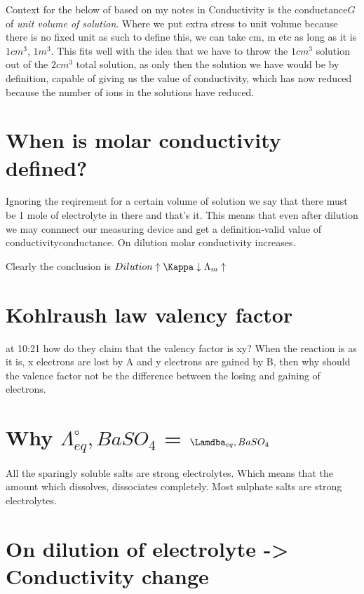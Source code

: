 \documentclass[12pt]{article}
\begin{document}
{Context for the below of based on my notes in 
Conductivity is the conductance{$G$} of \textit{unit volume of solution}. Where we put extra stress to unit volume because there is no fixed unit as such to define this, we can take cm, m etc as long as it is $1cm^{3}$, $1m^{3}$. This fits well with the idea that we have to throw the $1cm^{3}$ solution out of the $2cm^{3}$ total solution, as only then the solution we have would be by definition, capable of giving us the value of conductivity, which has now reduced because the number of ions in the solutions have reduced.

\section*{When is molar conductivity defined?}

Ignoring the reqirement for a certain volume of solution we say that there must be 1 mole of electrolyte in there and that's it. This means that even after dilution we may connnect our measuring device and get a definition-valid value of conductivity{conductance}. 
On dilution molar conductivity increases.

Clearly the conclusion is $Dilution\uparrow \Kappa \downarrow {\Lambda}_{m} \uparrow$

\section*{Kohlraush law valency factor}


at 10:21  how do they claim that the valency factor is xy? When the reaction is as it is, x electrons are lost by A and y electrons are gained by B, then why should the valence factor not be the difference between the losing and gaining of electrons.

\section*{Why $\Lambda _{eq}^{\circ}, {BaSO_{4}}$ = $\Lamdba _{eq}, {BaSO_{4}}$}

All the sparingly soluble salts are strong electrolytes. Which means that the amount which dissolves, dissociates completely.
Most sulphate salts are strong electrolytes.

\section*{On dilution of electrolyte -> Conductivity change}

}
\end{document}
